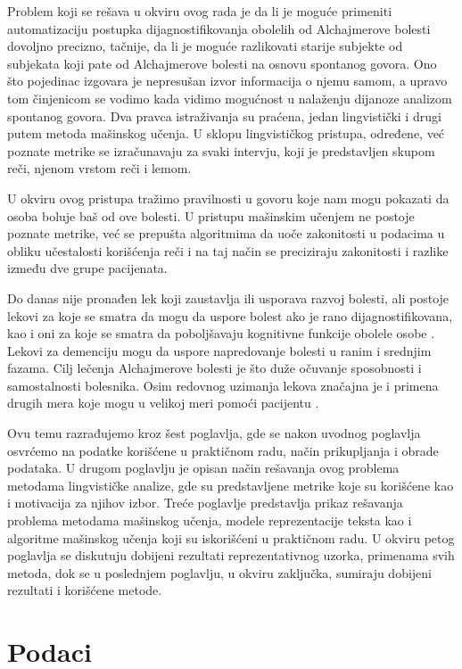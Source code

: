 \documentclass[12pt,oneside]{memoir}
\begin{document}
Problem koji se rešava u okviru ovog rada je da li je moguće primeniti automatizaciju postupka dijagnostifikovanja obolelih od Alchajmerove bolesti dovoljno precizno, tačnije, da li je moguće razlikovati starije subjekte od subjekata koji pate od Alchajmerove bolesti na osnovu spontanog govora. Ono što pojedinac izgovara je nepresušan izvor informacija o njemu samom, a upravo tom činjenicom se vodimo kada vidimo mogućnost u nalaženju dijanoze analizom spontanog govora. Dva pravca istraživanja su praćena, jedan lingvistički i drugi putem metoda mašinskog učenja. U sklopu lingvističkog pristupa,  određene, već poznate metrike se izračunavaju za svaki intervju, koji je predstavljen skupom reči, njenom vrstom reči i lemom.

U okviru ovog pristupa tražimo pravilnosti u govoru koje nam mogu pokazati da osoba boluje baš od ove bolesti. U pristupu mašinskim učenjem ne postoje poznate metrike, već se prepušta algoritmima da uoče zakonitosti u podacima u obliku učestalosti korišćenja reči i na taj način se preciziraju zakonitosti i razlike između dve grupe pacijenata.

Do danas nije pronađen lek koji zaustavlja ili usporava razvoj bolesti, ali postoje lekovi za koje se smatra da mogu da uspore bolest ako je rano dijagnostifikovana, kao i oni za koje se smatra da poboljšavaju kognitivne funkcije obolele osobe \cite{Alzheimerfactsfigures}. Lekovi za demenciju mogu da uspore napredovanje bolesti u ranim i srednjim fazama.  Cilj lečenja Alchajmerove bolesti je što duže očuvanje sposobnosti i samostalnosti bolesnika. Osim redovnog uzimanja lekova značajna je i primena drugih mera koje mogu u velikoj meri pomoći pacijentu \cite{medicor}.

Ovu temu razrađujemo kroz šest poglavlja, gde se nakon uvodnog poglavlja osvrćemo na podatke korišćene u praktičnom radu, način prikupljanja i obrade podataka. U drugom poglavlju je opisan način rešavanja ovog problema metodama lingvističke analize, gde su predstavljene metrike koje su korišćene kao i motivacija za njihov izbor. Treće poglavlje predstavlja prikaz rešavanja problema metodama mašinskog učenja, modele reprezentacije teksta kao i algoritme mašinskog učenja koji su iskorišćeni u praktičnom radu. U okviru petog poglavlja se diskutuju dobijeni rezultati reprezentativnog uzorka, primenama svih metoda, dok se u poslednjem poglavlju, u okviru zaključka, sumiraju dobijeni rezultati i korišćene metode.

\chapter{Podaci}
\end{document}
